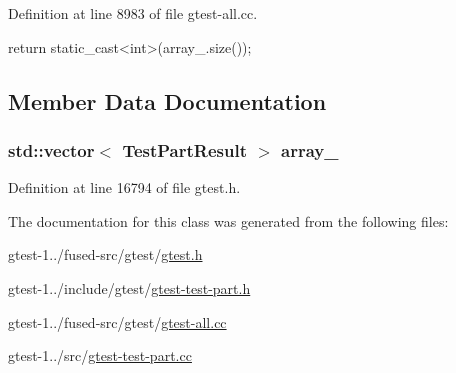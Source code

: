 \-Definition at line 8983 of file gtest-\/all.\-cc.


\begin{DoxyCode}
                                    {
  return static_cast<int>(array_.size());
}
\end{DoxyCode}


\subsection{\-Member \-Data \-Documentation}
\hypertarget{classtesting_1_1TestPartResultArray_aebdb2db88daab9962cd66a6e614ab24b}{
\subsubsection[{array\-\_\-}]{\setlength{\rightskip}{0pt plus 5cm}std\-::vector$<$ {\bf \-Test\-Part\-Result} $>$ {\bf array\-\_\-}}}\label{dc/dce/classtesting_1_1TestPartResultArray_aebdb2db88daab9962cd66a6e614ab24b}


\-Definition at line 16794 of file gtest.\-h.



\-The documentation for this class was generated from the following files\-:\begin{DoxyCompactItemize}
\item 
gtest-\/1../fused-\/src/gtest/\hyperlink{fused-src_2gtest_2gtest_8h}{gtest.\-h}\item 
gtest-\/1../include/gtest/\hyperlink{gtest-test-part_8h}{gtest-\/test-\/part.\-h}\item 
gtest-\/1../fused-\/src/gtest/\hyperlink{fused-src_2gtest_2gtest-all_8cc}{gtest-\/all.\-cc}\item 
gtest-\/1../src/\hyperlink{gtest-test-part_8cc}{gtest-\/test-\/part.\-cc}\end{DoxyCompactItemize}
